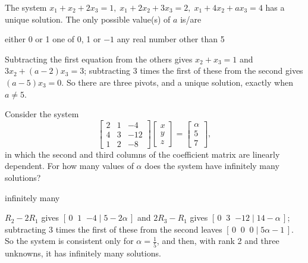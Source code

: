 \begin{question}[id=gate-cs2008-1, source=GATE CS 2008, marks=2]
The system $x_1 + x_2 + 2x_3 = 1,\; x_1 + 2x_2 + 3x_3 = 2,\; x_1 + 4x_2 + ax_3 = 4$ has a unique solution. The only possible value(s) of $a$ is/are
\begin{options}
  \option either 0 or 1
  \option one of 0, 1 or $-1$
  \correct any real number other than 5
\end{options}
\begin{solution}
Subtracting the first equation from the others gives $x_2 + x_3 = 1$ and $3x_2 + (a - 2)x_3 = 3$; subtracting 3 times the first of these from the second gives $(a - 5)x_3 = 0$. So there are three pivots, and a unique solution, exactly when $a \ne 5$.
\end{solution}
\end{question}

\begin{question}[id=gate-cs2003-1, source=GATE CS 2003, marks=2]
Consider the system
\[
  \begin{bmatrix} 2 & 1 & -4 \\ 4 & 3 & -12 \\ 1 & 2 & -8 \end{bmatrix}
  \begin{bmatrix} x \\ y \\ z \end{bmatrix} = \begin{bmatrix} \alpha \\ 5 \\ 7 \end{bmatrix},
\]
in which the second and third columns of the coefficient matrix are linearly dependent. For how many values of $\alpha$ does the system have infinitely many solutions?
\begin{options}
  \option infinitely many
\end{options}
\begin{solution}
$R_2 - 2R_1$ gives $[\,0 \;\; 1 \;\; {-4} \mid 5 - 2\alpha\,]$ and $2R_3 - R_1$ gives $[\,0 \;\; 3 \;\; {-12} \mid 14 - \alpha\,]$; subtracting 3 times the first of these from the second leaves $[\,0 \;\; 0 \;\; 0 \mid 5\alpha - 1\,]$. So the system is consistent only for $\alpha = \frac{1}{5}$, and then, with rank 2 and three unknowns, it has infinitely many solutions.
\end{solution}
\end{question}

